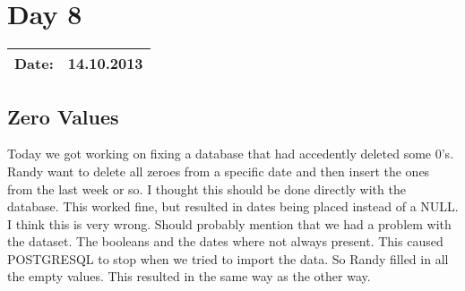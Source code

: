 \section{Day 8}
\begin{tabular}{|c|c|}
\hline
Date: & 14.10.2013 \\
\hline
\end{tabular}
\subsection{Zero Values}
Today we got working on fixing  a database that had accedently deleted some 0's. Randy want to delete all zeroes from a specific date and then insert the ones from the last week or so. I thought this should be done directly with the database. This worked fine, but resulted in dates being placed instead of a NULL. I think this is very wrong. Should probably mention that we had a problem with the dataset. The booleans and the dates where not always present. This caused POSTGRESQL to stop when we tried to import the data. So Randy filled in all the empty values. This resulted in the same way as the other way.

